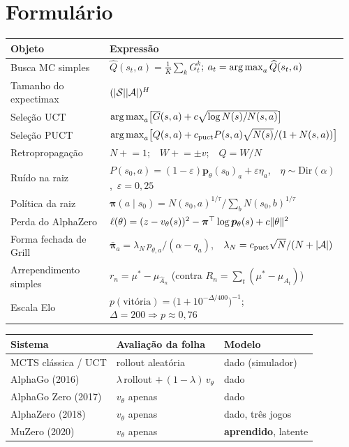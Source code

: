 \documentclass[11pt]{article}
\newcommand{\cpuct}{c_{\mathrm{puct}}}
\newcommand{\Nvis}{N}
\newcommand{\Wtot}{W}
\newcommand{\redeval}{v_{\theta}}
\newcommand{\redepol}{\bm{p}_{\theta}}
\newcommand{\raizpol}{\bm{\pi}}
\begin{document}
\section{Formulário}

\begin{center}
\begin{tabular}{@{}p{0.30\linewidth} p{0.66\linewidth}@{}}
\toprule
\textbf{Objeto} & \textbf{Expressão} \\
\midrule
Busca MC simples &
  $\widehat{Q}(s_t,a) = \frac{1}{K}\sum_k G^k_t$;\quad
  $a_t = \operatorname*{arg\,max}_a \widehat{Q}(s_t,a)$ \\[0.35em]
Tamanho do expectimax &
  $(\lvert\mathcal{S}\rvert\lvert\mathcal{A}\rvert)^{H}$ \\[0.35em]
Seleção UCT &
  $\argmax_a \bigl[\overline{G}(s,a) + c\sqrt{\log \Nvis(s)/\Nvis(s,a)}\bigr]$ \\[0.35em]
Seleção PUCT &
  $\argmax_a \bigl[Q(s,a) + \cpuct P(s,a)\sqrt{\Nvis(s)}/(1+\Nvis(s,a))\bigr]$ \\[0.35em]
Retropropagação &
  $\Nvis \mathrel{+}= 1$;\ \ $\Wtot \mathrel{+}= \pm v$;\ \ $Q = \Wtot/\Nvis$ \\[0.35em]
Ruído na raiz &
  $P(s_0,a) = (1-\varepsilon)\redepol(s_0)_a + \varepsilon \eta_a$,\ \
  $\eta\sim\mathrm{Dir}(\alpha)$,\ $\varepsilon = 0{,}25$ \\[0.35em]
Política da raiz &
  $\raizpol(a\mid s_0) = \Nvis(s_0,a)^{1/\tau} / \sum_b \Nvis(s_0,b)^{1/\tau}$ \\[0.35em]
Perda do AlphaZero &
  $\ell(\theta) = (z-\redeval(s))^2 - \raizpol^{\top}\log\redepol(s) + c\norm{\theta}^2$ \\[0.35em]
Forma fechada de Grill &
  $\bar{\raizpol}_a = \lambda_{\Nvis}\,p_{\theta,a}/(\alpha - q_a)$,\ \
  $\lambda_{\Nvis} = \cpuct\sqrt{\Nvis}/(\Nvis+\abs{\gA})$ \\[0.35em]
Arrependimento simples &
  $r_n = \mu^{*} - \mu_{\widehat{A}_n}$ \quad (contra $R_n = \sum_t (\mu^{*}-\mu_{A_t})$) \\[0.35em]
Escala Elo &
  $p(\text{vitória}) = \bigl(1 + 10^{-\Delta/400}\bigr)^{-1}$;\ \ $\Delta = 200 \Rightarrow p \approx 0{,}76$ \\
\bottomrule
\end{tabular}
\end{center}

\begin{center}
\begin{tabular}{@{}lll@{}}
\toprule
\textbf{Sistema} & \textbf{Avaliação da folha} & \textbf{Modelo} \\
\midrule
MCTS clássica / UCT & rollout aleatória & dado (simulador) \\
AlphaGo (2016)      & $\lambda\,$rollout $+\,(1-\lambda)\,\redeval$ & dado \\
AlphaGo Zero (2017) & $\redeval$ apenas & dado \\
AlphaZero (2018)    & $\redeval$ apenas & dado, três jogos \\
MuZero (2020)       & $\redeval$ apenas & \textbf{aprendido}, latente \\
\bottomrule
\end{tabular}
\end{center}
\end{document}
